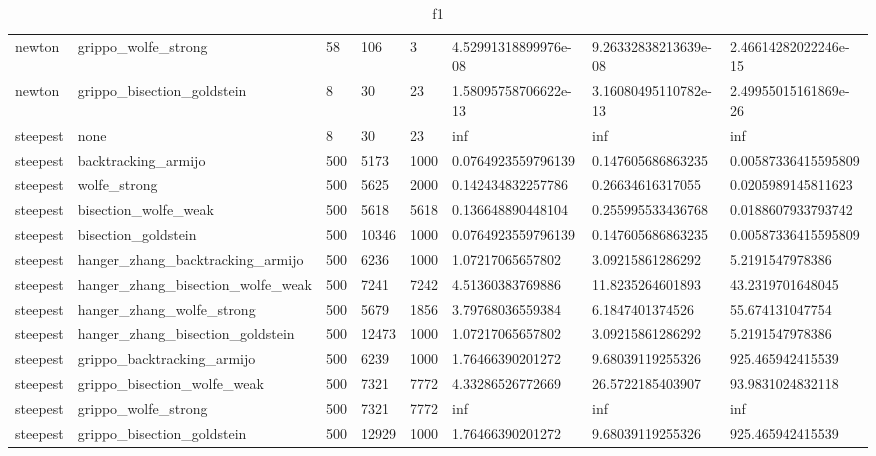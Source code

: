 \documentclass[a4paper,11pt]{article}
\numberwithin{equation}{section} %
\begin{document}
\begin{table}[h!]
{\begin{tabular}{|l|l|l|l|l|l|l|l|}
        newton & grippo\_wolfe\_strong & 58 & 106 & 3 & 4.52991318899976e-08 & 9.26332838213639e-08 & 2.46614282022246e-15 \\
        newton & grippo\_bisection\_goldstein & 8 & 30 & 23 & 1.58095758706622e-13 & 3.16080495110782e-13 & 2.49955015161869e-26 \\
        steepest & none & 8 & 30 & 23 & inf & inf & inf \\
        steepest & backtracking\_armijo & 500 & 5173 & 1000 & 0.0764923559796139 & 0.147605686863235 & 0.00587336415595809 \\
        steepest & wolfe\_strong & 500 & 5625 & 2000 & 0.142434832257786 & 0.26634616317055 & 0.0205989145811623 \\
        steepest & bisection\_wolfe\_weak & 500 & 5618 & 5618 & 0.136648890448104 & 0.255995533436768 & 0.0188607933793742 \\
        steepest & bisection\_goldstein & 500 & 10346 & 1000 & 0.0764923559796139 & 0.147605686863235 & 0.00587336415595809 \\
        steepest & hanger\_zhang\_backtracking\_armijo & 500 & 6236 & 1000 & 1.07217065657802 & 3.09215861286292 & 5.2191547978386 \\
        steepest & hanger\_zhang\_bisection\_wolfe\_weak & 500 & 7241 & 7242 & 4.51360383769886 & 11.8235264601893 & 43.2319701648045 \\
        steepest & hanger\_zhang\_wolfe\_strong & 500 & 5679 & 1856 & 3.79768036559384 & 6.1847401374526 & 55.674131047754 \\
        steepest & hanger\_zhang\_bisection\_goldstein & 500 & 12473 & 1000 & 1.07217065657802 & 3.09215861286292 & 5.2191547978386 \\
        steepest & grippo\_backtracking\_armijo & 500 & 6239 & 1000 & 1.76466390201272 & 9.68039119255326 & 925.465942415539 \\
        steepest & grippo\_bisection\_wolfe\_weak & 500 & 7321 & 7772 & 4.33286526772669 & 26.5722185403907 & 93.9831024832118 \\
        steepest & grippo\_wolfe\_strong & 500 & 7321 & 7772 & inf & inf & inf \\
        steepest & grippo\_bisection\_goldstein & 500 & 12929 & 1000 & 1.76466390201272 & 9.68039119255326 & 925.465942415539 \\
\end{tabular}}
\caption{f1}
\label{table:f1}
\end{table}
\end{document}
